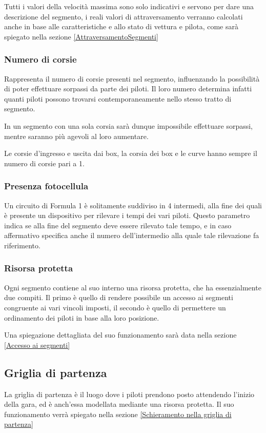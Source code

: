 \documentclass[a4paper,11pt, twoside]{book}
\begin{document}
	  Tutti i valori della velocità massima sono solo indicativi e servono per dare una descrizione del segmento,
	  i reali valori di attraversamento verranno calcolati anche in base alle caratteristiche e allo stato di 
	  vettura e pilota, come sarà spiegato nella sezione \ref{AttraversamentoSegmenti}
	    
	\subsubsection{Numero di corsie}
	  Rappresenta il numero di corsie presenti nel segmento, influenzando la possibilità
	  di poter effettuare sorpassi da parte dei piloti. Il loro numero determina infatti quanti piloti possono trovarsi
	  contemporaneamente nello stesso tratto di segmento.
	  
	  In un segmento con una sola corsia sarà dunque impossibile effettuare sorpassi, mentre saranno più agevoli
	  al loro aumentare.
	  
	  Le corsie d'ingresso e uscita dai box, la corsia dei box e le curve hanno sempre il numero di corsie pari
	  a 1.
	  
	\subsubsection{Presenza fotocellula}
	  Un circuito di Formula 1 è solitamente suddiviso in 4 intermedi, alla fine dei quali
	  è presente un dispositivo per rilevare i tempi dei vari piloti. Questo parametro
	  indica se alla fine del segmento deve essere rilevato tale tempo, e in caso affermativo
	  specifica anche il numero dell'intermedio alla quale tale rilevazione fa riferimento.
	
	\subsubsection{Risorsa protetta}
	  Ogni segmento contiene al suo interno una risorsa protetta, che ha essenzialmente due compiti. Il primo
	  è quello di rendere possibile un accesso ai segmenti congruente ai vari vincoli imposti, 
	  il secondo è quello di permettere un ordinamento dei piloti in base alla loro posizione.
	  
	  Una spiegazione dettagliata del suo funzionamento sarà data nella sezione \ref{Accesso ai segmenti}
	  
      \subsection{Griglia di partenza}
	La griglia di partenza è il luogo dove i piloti prendono posto attendendo l'inizio della gara, ed è anch'essa modellata
	mediante una risorsa protetta.
	Il suo funzionamento verrà spiegato nella sezione \ref{Schieramento nella griglia di partenza}
	  
\end{document}
